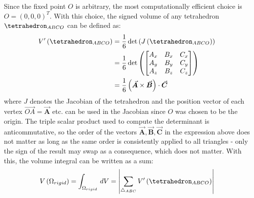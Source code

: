 \documentclass[oneside, a4paper]{book}
\newcommand\abs[1]{\left|#1\right|}
\newcommand\vek[1]{\vec{\bm{#1}}}
\newcommand\br[1]{\left(#1\right)}
\begin{document}
    Since the fixed point $O$ is arbitrary, the most computationally efficient choice is $O=\br{0,0,0}^T$. With this choice, the signed volume of any tetrahedron $\tetrahedron_{ABCO}$ can be defined as:
    \begin{align}
      V'\br{\tetrahedron_{ABCO}} &= \frac{1}{6}\det\br{J\br{\tetrahedron_{ABCO}}}\\
      &= \frac{1}{6}\det\br{\begin{bmatrix}
      A_x&B_x&C_x\\A_y&B_y&C_y\\A_z&B_z&C_z
      \end{bmatrix}}\\
      &= \frac{1}{6}\br{\vek{A} \times \vek{B}} \cdot \vek{C}
    \end{align}
    where $J$ denotes the Jacobian of the tetrahedron and the position vector of each vertex $\overrightarrow{OA}=\vek{A}$ etc. can be used in the Jacobian since $O$ was chosen to be the origin. The triple scalar product used to compute the determinant is anticommutative, so the order of the vectors $\vek{A},\vek{B},\vek{C}$ in the expression above does not matter as long as the same order is consistently applied to all triangles - only the sign of the result may  swap as a consequence, which does not matter. With this, the volume integral can be written as a sum:
    \begin{equation}
      V\br{\Omega_{rigid}} = \int_{\Omega_{rigid}} \,dV = \abs{\sum_{\triangle_{ABC}} V'\br{\tetrahedron_{ABCO}}}
    \end{equation}

    
    
    
    
\end{document}
